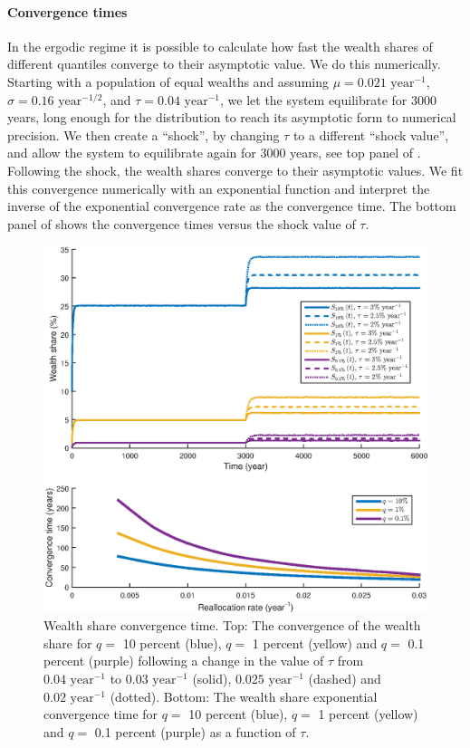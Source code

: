 \paragraph{Convergence times}

In the ergodic regime it is possible to calculate how fast the wealth shares of different quantiles converge to their asymptotic value. We do this numerically. Starting with a population of equal wealths and assuming $\mu=0.021 \text{ year}^{-1}$, $\sigma=0.16 \text{ year}^{-1/2}$, and $\tau = 0.04\text{ year}^{-1}$, we let the system equilibrate for 3000 years, long enough for the distribution to reach its asymptotic form to numerical precision. We then create a ``shock'', by changing $\tau$ to a different ``shock value'', and allow the system to equilibrate again for 3000 years, see top panel of . Following the shock, the wealth shares converge to their asymptotic values. We fit this convergence numerically with an exponential function and interpret the inverse of the exponential convergence rate as the convergence time. The bottom panel of   shows the convergence times versus the shock value of $\tau$.

\begin{figure}[!htb]
\centering
\includegraphics[width=1.0\textwidth] {./chapter_3/figs/convergence.eps}
\caption{Wealth share convergence time. Top: The convergence of the wealth share for $q=$ 10 percent (blue), $q=$ 1 percent (yellow) and $q=$ 0.1 percent (purple) following a change in the value of $\tau$ from $0.04\text{ year}^{-1}$ to $0.03\text{ year}^{-1}$ (solid), $0.025\text{ year}^{-1}$ (dashed) and $0.02\text{ year}^{-1}$ (dotted). Bottom: The wealth share exponential convergence time for $q=$ 10 percent (blue), $q=$ 1 percent (yellow) and $q=$ 0.1 percent (purple) as a function of $\tau$.}
\end{figure}

